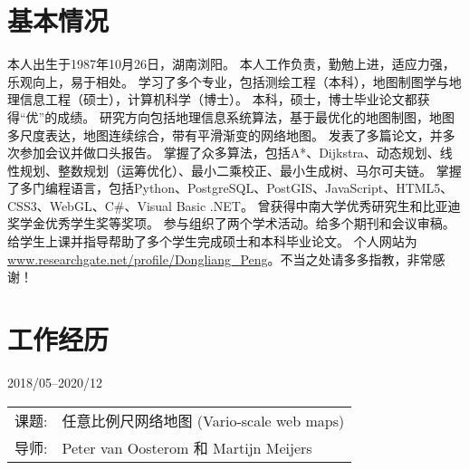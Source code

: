 \documentclass{resume}
\begin{document}


 
\section{基本情况}
本人出生于1987年10月26日，湖南浏阳。
本人工作负责，勤勉上进，适应力强，乐观向上，易于相处。
学习了多个专业，包括测绘工程（本科），地图制图学与地理信息工程（硕士），计算机科学（博士）。
本科，硕士，博士毕业论文都获得“优”的成绩。
研究方向包括地理信息系统算法，基于最优化的地图制图，地图多尺度表达，地图连续综合，带有平滑渐变的网络地图。
发表了多篇论文，并多次参加会议并做口头报告。
掌握了众多算法，包括A*、Dijkstra、动态规划、线性规划、整数规划（运筹优化）、最小二乘校正、最小生成树、马尔可夫链。
掌握了多门编程语言，包括Python、PostgreSQL、PostGIS、JavaScript、HTML5、CSS3、WebGL、C\#、Visual Basic .NET。
曾获得中南大学优秀研究生和比亚迪奖学金优秀学生奖等奖项。
参与组织了两个学术活动。给多个期刊和会议审稿。
给学生上课并指导帮助了多个学生完成硕士和本科毕业论文。
个人网站为\url{www.researchgate.net/profile/Dongliang_Peng}。不当之处请多多指教，非常感谢！\footnotemark
{}

\section{工作经历}
{2018/05--2020/12}
\begin{tabular}{ll}	
	课题:  &  任意比例尺网络地图 (Vario-scale web maps) \\
	导师:      & Peter van Oosterom 和 Martijn Meijers
\end{tabular}%


\end{document}
